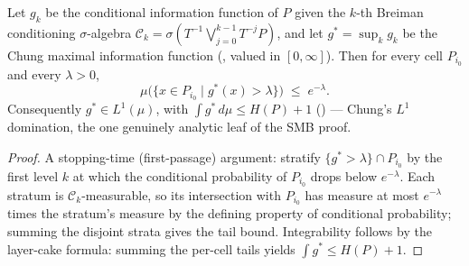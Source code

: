 \begin{theorem}\label{chungTail}
  \leanok
  Let \(g_k\) be the conditional information function of \(P\) given the \(k\)-th Breiman
  conditioning \(\sigma\)-algebra
  \(\mathcal C_k = \sigma(T^{-1}\bigvee_{j=0}^{k-1}T^{-j}P)\), and let
  \(g^{*} = \sup_k g_k\) be the Chung maximal information function
  (, valued in \([0,\infty]\)). Then for every cell
  \(P_{i_0}\) and every \(\lambda > 0\),
  \[
    \mu\bigl(\{x \in P_{i_0} \mid g^{*}(x) > \lambda\}\bigr) \;\le\; e^{-\lambda}.
  \]
  Consequently \(g^{*} \in L^1(\mu)\), with
  \(\int g^{*}\,d\mu \le H(P) + 1\)
  () --- Chung's \(L^1\) domination,
  the one genuinely analytic leaf of the SMB proof.
\end{theorem}
\begin{proof}\leanok
  A stopping-time (first-passage) argument: stratify \(\{g^{*} > \lambda\}\cap P_{i_0}\) by the
  first level \(k\) at which the conditional probability of \(P_{i_0}\) drops below
  \(e^{-\lambda}\). Each stratum is \(\mathcal C_k\)-measurable, so its intersection with
  \(P_{i_0}\) has measure at most \(e^{-\lambda}\) times the stratum's measure by the defining
  property of conditional probability; summing the disjoint strata gives the tail bound.
  Integrability follows by the layer-cake formula: summing the per-cell tails yields
  \(\int g^{*} \le H(P) + 1\).
\end{proof}

